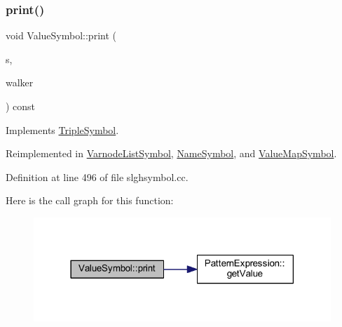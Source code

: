 \mbox{\label{class_value_symbol_a82b3d3fbfc6d3ed118103f12220cdfd4}} 
\subsubsection{\texorpdfstring{print()}{print()}}
{\footnotesize\ttfamily void Value\+Symbol\+::print (\begin{DoxyParamCaption}\item[{ostream \&}]{s,  }\item[{\mbox{\hyperlink{class_parser_walker}{Parser\+Walker}} \&}]{walker }\end{DoxyParamCaption}) const\hspace{0.3cm}{\ttfamily [virtual]}}



Implements \mbox{\hyperlink{class_triple_symbol_a205c4487d3ad54532097dd77eb4501fc}{Triple\+Symbol}}.



Reimplemented in \mbox{\hyperlink{class_varnode_list_symbol_a3dbd47d58a39197a6126fec8a0b11be4}{Varnode\+List\+Symbol}}, \mbox{\hyperlink{class_name_symbol_a611940036621c526ec59691bc8a749bb}{Name\+Symbol}}, and \mbox{\hyperlink{class_value_map_symbol_a706eaaae2c92d3927855bc34d10f2cc1}{Value\+Map\+Symbol}}.



Definition at line 496 of file slghsymbol.\+cc.

Here is the call graph for this function\+:
\nopagebreak
\begin{figure}[H]
\begin{center}
\leavevmode
\includegraphics[width=318pt]{class_value_symbol_a82b3d3fbfc6d3ed118103f12220cdfd4_cgraph}
\end{center}
\end{figure}
\mbox{\label{class_value_symbol_af9104983ea7381b608fe56b5ab8a2d7c}} 
